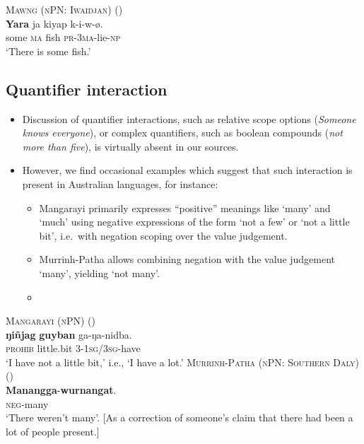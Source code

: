 \documentclass{article}
\begin{document}
\begin{exe}
  \ex\label{ex:dyara} \textsc{Mawng (nPN: Iwaidjan)} (\citealt{ngaralk})\\
  \gll \textbf{Yara} ja kiyap k-i-w-ø.\\
  some \textsc{ma} fish \textsc{pr-3ma}-lie-\textsc{np}\\
  \glt `There is some fish.' %
\end{exe}

\subsection{Quantifier interaction}
\begin{itemize}
\item Discussion of quantifier interactions, such as relative scope options (\textit{Someone knows everyone}), or complex quantifiers, such as boolean compounds (\textit{not more than five}), is virtually absent in our sources.
\item However, we find occasional examples which suggest that such interaction is present in Australian languages, for instance:
  \begin{itemize}
  \item Mangarayi primarily expresses ``positive'' meanings like `many' and `much' using negative expressions of the form `not a few' or `not a little bit', i.e.\ with negation scoping over the value judgement.
  \item Murrinh-Patha allows combining negation with the value judgement `many', yielding `not many'.
  \item %
  \end{itemize}
\end{itemize}
\begin{exe}
  \ex \textsc{Mangarayi (nPN)} (\citealt[37--38]{merlan89}) \\
  \gll \textbf{ŋi\~{n}jag} \textbf{guyban} ga-ŋa-nidba.\\
  \textsc{prohib} little.bit 3-1\textsc{sg}/3\textsc{sg}-have\\
  \glt `I have not a little bit,' i.e., `I have a lot.'
  \ex \textsc{Murrinh-Patha (nPN: Southern Daly)} (\citealt[107]{blythe09})\\
  \gll \textbf{Manangga}-\textbf{wurnangat}.\\
  \textsc{neg}-many\\
  \glt `There weren't many'. [As a correction of someone's claim that there had been a lot of people present.]
\end{exe}
\end{document}
